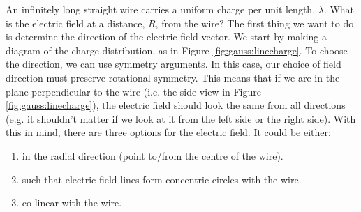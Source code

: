 \begin{example}{An infinitely long straight wire carries a uniform charge per unit length, $\lambda$. What is the electric field at a distance, $R$, from the wire?}
The first thing we want to do is determine the direction of the electric field vector. We start by making a diagram of the charge distribution, as in Figure \ref{fig:gauss:linecharge}. To choose the direction, we can use symmetry arguments. In this case,  our choice of field direction must preserve rotational symmetry. This means that if we are in the plane perpendicular to the wire (i.e. the side view in Figure \ref{fig:gauss:linecharge}), the electric field should look the same from all directions (e.g. it shouldn't matter if we look at it from the left side or the right side). With this in mind, there are three options for the electric field. It could be either:
\begin{enumerate}
\item in the radial direction (point to/from the centre of the wire).
\item such that electric field lines form concentric circles with the wire.
\item co-linear with the wire.
\end{enumerate}



\end{example}

